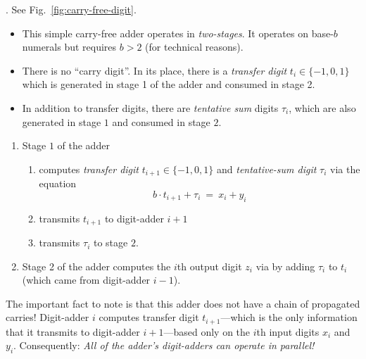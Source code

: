 . 
See Fig.~\ref{fig:carry-free-digit}.
\begin{itemize}
\item
This simple carry-free adder operates in {\em two-stages}.  It operates on base-$b$ numerals but requires $b > 2$ (for technical reasons).
\item
There is no ``carry digit''.  In its place, there is a {\it transfer digit} $t_i \in \{-1, 0, 1\}$ which is generated in stage 1 of the adder and consumed in stage 2.
\item
In addition to transfer digits, there are {\it tentative sum} digits $\tau_i$, which are also generated in stage $1$ and consumed in stage $2$.
\end{itemize}
\begin{enumerate}
\item
Stage $1$ of the adder
\begin{enumerate}
\item
computes {\it transfer digit} $t_{i+1} \in \{-1, 0 , 1\}$ and {\it tentative-sum digit} $\tau_i$ via the equation
\[ b \cdot t_{i+1} + \tau_i \ = \ x_i + y_i \]
\item
transmits $t_{i+1}$ to digit-adder $i+1$
\item
transmits $\tau_i$ to stage $2$.
\end{enumerate}
\item
Stage 2 of the adder computes the $i$th output digit $z_i$ via by adding $\tau_i$ to $t_i$ (which came from digit-adder $i-1$).
\end{enumerate}
The important fact to note is that this adder does not have a chain of propagated carries!  Digit-adder $i$ computes transfer digit $t_{i+1}$---which is the only information that it transmits to
digit-adder $i+1$---based only on the $i$th input digits $x_i$ and $y_i$.  Consequently: {\em All of the adder's digit-adders can operate in parallel!}
